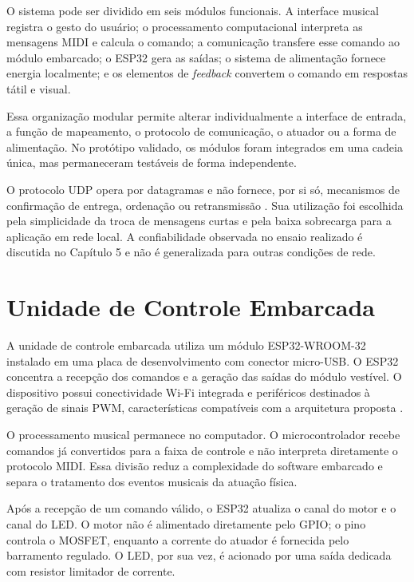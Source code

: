 O sistema pode ser dividido em seis módulos funcionais. A interface musical registra o gesto do usuário; o processamento computacional interpreta as mensagens MIDI e calcula o comando; a comunicação transfere esse comando ao módulo embarcado; o ESP32 gera as saídas; o sistema de alimentação fornece energia localmente; e os elementos de \textit{feedback} convertem o comando em respostas tátil e visual.

Essa organização modular permite alterar individualmente a interface de entrada, a função de mapeamento, o protocolo de comunicação, o atuador ou a forma de alimentação. No protótipo validado, os módulos foram integrados em uma cadeia única, mas permaneceram testáveis de forma independente.

O protocolo UDP opera por datagramas e não fornece, por si só, mecanismos de confirmação de entrega, ordenação ou retransmissão \cite{postel1980udp}. Sua utilização foi escolhida pela simplicidade da troca de mensagens curtas e pela baixa sobrecarga para a aplicação em rede local. A confiabilidade observada no ensaio realizado é discutida no Capítulo 5 e não é generalizada para outras condições de rede.

\section{Unidade de Controle Embarcada}
\label{sec:esp32}

A unidade de controle embarcada utiliza um módulo ESP32-WROOM-32 instalado em uma placa de desenvolvimento com conector micro-USB. O ESP32 concentra a recepção dos comandos e a geração das saídas do módulo vestível. O dispositivo possui conectividade Wi-Fi integrada e periféricos destinados à geração de sinais PWM, características compatíveis com a arquitetura proposta \cite{espressif2026esp32,espressifledc}.

O processamento musical permanece no computador. O microcontrolador recebe comandos já convertidos para a faixa de controle e não interpreta diretamente o protocolo MIDI. Essa divisão reduz a complexidade do software embarcado e separa o tratamento dos eventos musicais da atuação física.

Após a recepção de um comando válido, o ESP32 atualiza o canal do motor e o canal do LED. O motor não é alimentado diretamente pelo GPIO; o pino controla o MOSFET, enquanto a corrente do atuador é fornecida pelo barramento regulado. O LED, por sua vez, é acionado por uma saída dedicada com resistor limitador de corrente.

